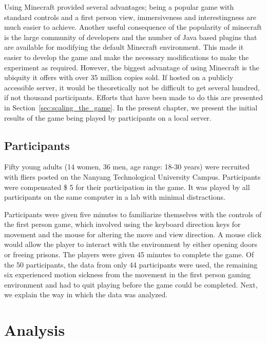Using Minecraft provided several advantages; being a popular game with standard controls and a first person view, immersiveness and interestingness are much easier to achieve. Another useful consequence of the popularity of minecraft is the large community of developers and the number of Java based plugins that are available for modifying the default Minecraft environment. This made it easier to develop the game and make the necessary modifications to make the experiment as required. However, the biggest advantage of using Minecraft is the ubiquity it offers with over 35 million copies sold. If hosted on a publicly accessible server, it would be theoretically not be difficult to get several hundred, if not thousand participants. Efforts that have been made to do this are presented in Section~\ref{sec:scaling_the_game}. In the present chapter, we present the initial results of the game being played by participants on a local server.


\subsection{Participants} %
\label{sec:participants}

Fifty young adults (14 women, 36 men, age range: 18-30 years) were recruited with fliers posted on the Nanyang Technological University Campus. Participants were compensated \$ 5 for their participation in the game. It was played by all participants on the same computer in a lab with minimal distractions.

Participants were given five minutes to familiarize themselves with the controls of the first person game, which involved using the keyboard direction keys for movement and the mouse for altering the move and view direction. A mouse click would allow the player to interact with the environment by either opening doors or freeing prisons. The players were given 45 minutes to complete the game. Of the 50 participants, the data from only 44 participants were used, the remaining six experienced motion sickness from the movement in the first person gaming environment and had to quit playing before the game could be completed. Next, we explain the way in which the data was analyzed.

\section{Analysis} %
\label{sec:methodologies}

